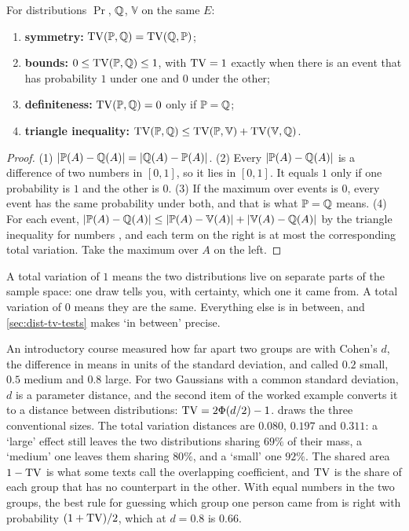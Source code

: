 \begin{proposition}
\label{prop:tv-metric}
For distributions $\Pr$, $\mathbb{Q}$, $\mathbb{V}$ on the same $E$:
\begin{enumerate}[nosep]
\item \textbf{symmetry:} $\mathrm{TV}(\mathbb{P}, \mathbb{Q}) = \mathrm{TV}(\mathbb{Q}, \mathbb{P})$;
\item \textbf{bounds:} $0 \leq \mathrm{TV}(\mathbb{P}, \mathbb{Q}) \leq 1$, with $\mathrm{TV} = 1$ exactly when there is an event that has probability $1$ under one and $0$ under the other;
\item \textbf{definiteness:} $\mathrm{TV}(\mathbb{P}, \mathbb{Q}) = 0$ only if $\mathbb{P} = \mathbb{Q}$;
\item \textbf{triangle inequality:} $\mathrm{TV}(\mathbb{P}, \mathbb{Q}) \leq \mathrm{TV}(\mathbb{P}, \mathbb{V}) + \mathrm{TV}(\mathbb{V}, \mathbb{Q})$.
\end{enumerate}
\end{proposition}

\begin{proof}
(1) $\lvert\mathbb{P}(A) - \mathbb{Q}(A)\rvert = \lvert\mathbb{Q}(A) - \mathbb{P}(A)\rvert$.
(2) Every $\lvert\mathbb{P}(A) - \mathbb{Q}(A)\rvert$ is a difference of two numbers in $[0,1]$, so it lies in $[0,1]$. It equals $1$ only if one probability is $1$ and the other is $0$.
(3) If the maximum over events is $0$, every event has the same probability under both, and that is what $\mathbb{P} = \mathbb{Q}$ means.
(4) For each event, $\lvert\mathbb{P}(A) - \mathbb{Q}(A)\rvert \leq \lvert\mathbb{P}(A) - \mathbb{V}(A)\rvert + \lvert\mathbb{V}(A) - \mathbb{Q}(A)\rvert$ by the triangle inequality for numbers , and each term on the right is at most the corresponding total variation. Take the maximum over $A$ on the left.
\end{proof}

A total variation of $1$ means the two distributions live on separate parts of the sample space: one draw tells you, with certainty, which one it came from.
A total variation of $0$ means they are the same.
Everything else is in between, and \cref{sec:dist-tv-tests} makes `in between' precise.

\begin{bridge}
An introductory course measured how far apart two groups are with Cohen's $d$, the difference in means in units of the standard deviation, and called $0.2$ small, $0.5$ medium and $0.8$ large.
For two Gaussians with a common standard deviation, $d$ is a parameter distance, and the second item of the worked example converts it to a distance between distributions: $\mathrm{TV} = 2\Phi(d/2) - 1$.
 draws the three conventional sizes.
The total variation distances are $0.080$, $0.197$ and $0.311$: a `large' effect still leaves the two distributions sharing $69\%$ of their mass, a `medium' one leaves them sharing $80\%$, and a `small' one $92\%$.
The shared area $1 - \mathrm{TV}$ is what some texts call the overlapping coefficient, and $\mathrm{TV}$ is the share of each group that has no counterpart in the other.
With equal numbers in the two groups, the best rule for guessing which group one person came from is right with probability $(1 + \mathrm{TV})/2$, which at $d = 0.8$ is $0.66$.
\end{bridge}

